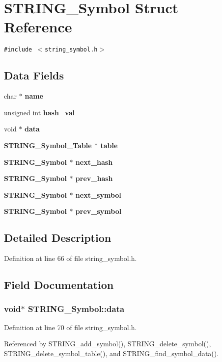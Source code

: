 \section{STRING\_\-Symbol Struct Reference}
\label{structSTRING__Symbol}
{\tt \#include $<$string\_\-symbol.h$>$}

\subsection*{Data Fields}
\begin{CompactItemize}
\item 
char $\ast$ \bf{name}
\item 
unsigned int \bf{hash\_\-val}
\item 
void $\ast$ \bf{data}
\item 
\bf{STRING\_\-Symbol\_\-Table} $\ast$ \bf{table}
\item 
\bf{STRING\_\-Symbol} $\ast$ \bf{next\_\-hash}
\item 
\bf{STRING\_\-Symbol} $\ast$ \bf{prev\_\-hash}
\item 
\bf{STRING\_\-Symbol} $\ast$ \bf{next\_\-symbol}
\item 
\bf{STRING\_\-Symbol} $\ast$ \bf{prev\_\-symbol}
\end{CompactItemize}


\subsection{Detailed Description}




Definition at line 66 of file string\_\-symbol.h.

\subsection{Field Documentation}
\subsubsection{\setlength{\rightskip}{0pt plus 5cm}void$\ast$ \bf{STRING\_\-Symbol::data}}\label{structSTRING__Symbol_1cffd5937e773a688315d44a0fd8d50f}




Definition at line 70 of file string\_\-symbol.h.

Referenced by STRING\_\-add\_\-symbol(), STRING\_\-delete\_\-symbol(), STRING\_\-delete\_\-symbol\_\-table(), and STRING\_\-find\_\-symbol\_\-data().
